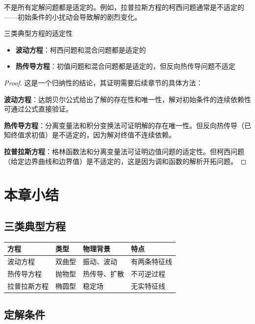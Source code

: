 \begin{tishi}
不是所有定解问题都是适定的。例如，拉普拉斯方程的柯西问题通常是不适定的——初始条件的小扰动会导致解的剧烈变化。
\end{tishi}

\begin{dingli}{三类典型方程的适定性}{}
\begin{itemize}
    \item \textbf{波动方程}：柯西问题和混合问题都是适定的
    \item \textbf{热传导方程}：初值问题和混合问题都是适定的，但反向热传导问题不适定
    \end{itemize}
\end{dingli}

\begin{proof}
这是一个归纳性的结论，其证明需要后续章节的具体方法：

\textbf{波动方程}：达朗贝尔公式给出了解的存在性和唯一性，解对初始条件的连续依赖性可通过公式直接验证。

\textbf{热传导方程}：分离变量法和积分变换法可证明解的存在唯一性。但反向热传导（已知终值求初值）是不适定的，因为解对终值不连续依赖。

\textbf{拉普拉斯方程}：格林函数法和分离变量法可证明边值问题的适定性。但柯西问题（给定边界曲线和边界值）是不适定的，这是因为调和函数的解析开拓问题。
\end{proof}
\section{本章小结}

\subsection{三类典型方程}

\begin{table}[htbp]
\centering
\begin{tabular}{llll}
\toprule
\textbf{方程} & \textbf{类型} & \textbf{物理背景} & \textbf{特点} \\
\midrule
波动方程 & 双曲型 & 振动、波动 & 有两条特征线 \\
热传导方程 & 抛物型 & 热传导、扩散 & 不可逆过程 \\
拉普拉斯方程 & 椭圆型 & 稳定场 & 无实特征线 \\
\bottomrule
\end{tabular}
\end{table}

\subsection{定解条件}

